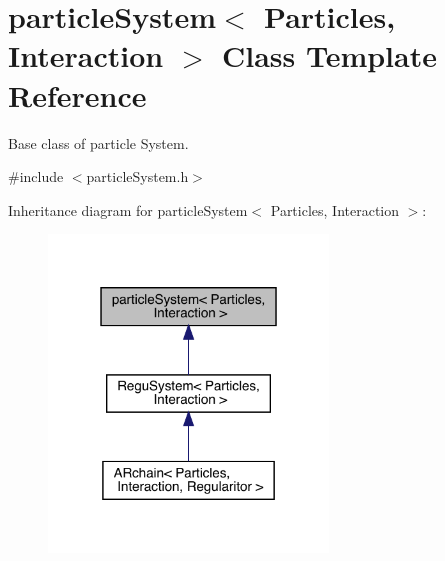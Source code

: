 \hypertarget{classparticle_system}{}\section{particle\+System$<$ Particles, Interaction $>$ Class Template Reference}
\label{classparticle_system}


Base class of particle System.  




{\ttfamily \#include $<$particle\+System.\+h$>$}



Inheritance diagram for particle\+System$<$ Particles, Interaction $>$\+:
\nopagebreak
\begin{figure}[H]
\begin{center}
\leavevmode
\includegraphics[width=211pt]{classparticle_system__inherit__graph}
\end{center}
\end{figure}
